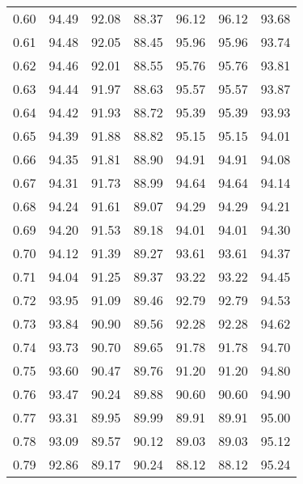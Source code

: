 \begin{tabular}{|c|c|c|c|c|c|c|}
      0.60 &     94.49 &     92.08 &      88.37 &   96.12 &      96.12 &         93.68 \\
      0.61 &     94.48 &     92.05 &      88.45 &   95.96 &      95.96 &         93.74 \\
      0.62 &     94.46 &     92.01 &      88.55 &   95.76 &      95.76 &         93.81 \\
      0.63 &     94.44 &     91.97 &      88.63 &   95.57 &      95.57 &         93.87 \\
      0.64 &     94.42 &     91.93 &      88.72 &   95.39 &      95.39 &         93.93 \\
      0.65 &     94.39 &     91.88 &      88.82 &   95.15 &      95.15 &         94.01 \\
      0.66 &     94.35 &     91.81 &      88.90 &   94.91 &      94.91 &         94.08 \\
      0.67 &     94.31 &     91.73 &      88.99 &   94.64 &      94.64 &         94.14 \\
      0.68 &     94.24 &     91.61 &      89.07 &   94.29 &      94.29 &         94.21 \\
      0.69 &     94.20 &     91.53 &      89.18 &   94.01 &      94.01 &         94.30 \\
      0.70 &     94.12 &     91.39 &      89.27 &   93.61 &      93.61 &         94.37 \\
      0.71 &     94.04 &     91.25 &      89.37 &   93.22 &      93.22 &         94.45 \\
      0.72 &     93.95 &     91.09 &      89.46 &   92.79 &      92.79 &         94.53 \\
      0.73 &     93.84 &     90.90 &      89.56 &   92.28 &      92.28 &         94.62 \\
      0.74 &     93.73 &     90.70 &      89.65 &   91.78 &      91.78 &         94.70 \\
      0.75 &     93.60 &     90.47 &      89.76 &   91.20 &      91.20 &         94.80 \\
      0.76 &     93.47 &     90.24 &      89.88 &   90.60 &      90.60 &         94.90 \\
      0.77 &     93.31 &     89.95 &      89.99 &   89.91 &      89.91 &         95.00 \\
      0.78 &     93.09 &     89.57 &      90.12 &   89.03 &      89.03 &         95.12 \\
      0.79 &     92.86 &     89.17 &      90.24 &   88.12 &      88.12 &         95.24 \\

\end{tabular}
